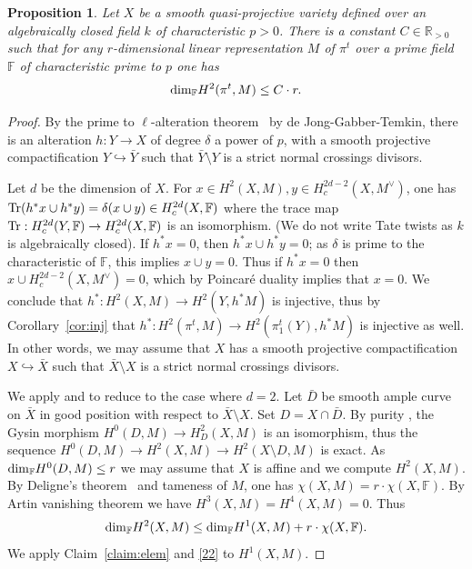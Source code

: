 \documentclass[12pt]{amsart}
\theoremstyle{plain}
\newtheorem{prop}[thm]{Proposition}
\theoremstyle{definition}
\numberwithin{thm}{section}
\newcommand{\ga}[2]{\begin{gather}\label{#1}#2 \end{gather}}
\newcommand{\F}{{\mathbb F}}
\newcommand{\R}{{\mathbb R}}
\numberwithin{equation}{section}
\begin{document}
\begin{prop} \label{prop:tamel}
Let $X$ be a smooth quasi-projective variety defined over an algebraically closed field $k$ of characteristic $p>0$. There is a constant $C\in \R_{>0}$ such that for any  $r$-dimensional linear representation $M$ of $\pi^t$ over a prime field $\F$ of characteristic prime to  $p$ one has 
\ga{}{ {\rm dim}_{\F} H^2(\pi^t, M)\le C\cdot r.\notag}


\end{prop}

\begin{proof}
By the prime to $\ell$-alteration theorem~\cite[Thm.~1.2.5]{Tem17} by de Jong-Gabber-Temkin, there is an  alteration $h: Y\to X$ of degree $\delta$ a power of $p$, 
with a smooth projective  compactification $Y\hookrightarrow \bar Y$ such that $\bar Y\setminus Y$ is a strict normal crossings divisors. 


Let $d$ be the dimension of $X$. For $x\in H^2(X, M), y\in 
H^{2d-2}_c(X, M^\vee)$, one has ${\rm Tr} (h^*x\cup h^*y)=\delta (x\cup y) \in H^{2d}_c(X, \F)$ where the trace map ${\rm Tr}:  H^{2d}_c(Y, \F)\to H^{2d}_c(X,\F)$ is an isomorphism. (We do not write Tate twists as $k$ is algebraically closed). If $h^*x=0$, then $h^*x\cup h^*y=0$; as $\delta$ is prime to the characteristic of $\F$, this implies $x\cup y=0$.  Thus if $h^*x=0$ then $x\cup H^{2d-2}_c(X,M^\vee)=0$, which by Poincar\'e duality \cite[Expos\'e~XVIII, Th\'eor\`eme~3.2.5]{SGA4}  implies that $x=0$.  We conclude that $h^*: H^2(X, M)\to H^2(Y, h^*M)$ is injective, thus by Corollary~\ref{cor:inj} that $h^*: H^2(\pi^t, M)\to H^2(\pi_1^t(Y), h^*M)$ is injective as well. In other words, we may assume that  $X$ has a smooth projective  compactification $X\hookrightarrow \bar X$ such that $\bar X\setminus X$ is a strict normal crossings divisors.

We apply \cite[Theorem~1.1 b)]{EK16} and \cite[X, p.90]{SGA2} to reduce to the case where $d=2$. Let $\bar D$ be smooth ample curve on $\bar X$ in good position with respect to $\bar X\setminus X$. Set $D=X\cap \bar D$. 
By purity \cite[XVI, Th\'eor\`eme.~3.7]{SGA4},  the Gysin morphism
$H^0(D, M) \to H^2_D(X, M)$ is an isomorphism, thus the sequence
$H^0(D, M)\to H^2(X, M)\to H^2(X\setminus D, M)$ is exact. 
As ${\rm dim}_{\F} H^0(D, M) \le r$ we may assume that $X$ is affine and we compute $H^2(X,M)$. 
By Deligne's theorem~\cite[Th\'eor\`eme~2.1]{Ill81}  and tameness of $M$, one has 
$\chi(X, M)=r\cdot \chi(X, \F)$. 
By Artin vanishing theorem \cite[Corollaire~3.5]{SGA4} we have $H^3(X,M)=H^4(X,M)=0$. Thus 
\[{\rm dim}_{\F} H^2(X,M) \le {\rm dim}_{\F}H^1(X, M) + r\cdot \chi(X,\F).\] 
We apply Claim~\ref{claim:elem}  and \eqref{22} to $H^1(X, M)$. 


\end{proof}
\end{document}
